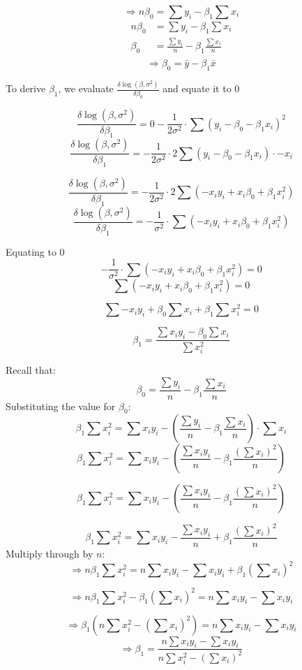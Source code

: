 \documentclass[
]{article}
\begin{document}
\[
\Rightarrow
n\beta_0  = \sum y_i - \beta_1\sum x_i
\] \begin{align*}
  n\beta_0  & = \sum y_i - \beta_1\sum x_i \\
  \beta_0   & = \frac{\sum y_i}{n} - \beta_1\frac{\sum x_i}{n} \\
\end{align*} \[
\boxed {\Rightarrow \beta_0 = \bar{y} - \beta_1\bar{x}}
\]

To derive \(\beta_1\), we evaluate
\(\frac{\delta\log(\beta,\sigma^2)}{\delta\beta_0}\) and equate it to
\(0\)

\[
\frac{\delta\log(\beta,\sigma^2)}{\delta\beta_1} 
=
0 - \frac{1}{2\sigma^2} \cdot \sum {(y_i - \beta_0 - \beta_1x_i)}^2
\] \[
\frac{\delta\log(\beta,\sigma^2)}{\delta\beta_1} 
=
-\frac{1}{2\sigma^2} \cdot 2\sum {(y_i - \beta_0 - \beta_1x_i)}\cdot -x_i
\]

\[
\frac{\delta\log(\beta,\sigma^2)}{\delta\beta_1} 
=
-\frac{1}{2\sigma^2} \cdot 2\sum {(-x_iy_i + x_i\beta_0 + \beta_1x_i^2)}
\] \[
\frac{\delta\log(\beta,\sigma^2)}{\delta\beta_1} 
=
-\frac{1}{\sigma^2} \cdot \sum (-x_iy_i + x_i\beta_0 + \beta_1x_i^2)
\]

Equating to \(0\) \[
-\frac{1}{\sigma^2} \cdot\sum {(-x_iy_i + x_i\beta_0 + \beta_1x_i^2)} = 0
\] \[
\sum {(-x_iy_i + x_i\beta_0 + \beta_1x_i^2)} = 0
\]

\[ 
  \sum -x_iy_i + \beta_0\sum x_i + \beta_1\sum x_i^2  = 0 
\]

\[
\beta_1  = \frac{\sum x_iy_i -  \beta_0\sum x_i}{\sum x_i^2}
\]

Recall that: \[
\beta_0    = \frac{\sum y_i}{n} - \beta_1\frac{\sum x_i}{n} 
\] Substituting the value for \(\beta_0\): \[
\beta_1\sum x_i^2  =
{\sum x_iy_i - 
\left( \frac{\sum y_i}{n} - 
\beta_1\frac{\sum x_i}{n} \right) \cdot \sum x_i}
\] \[
\beta_1\sum x_i^2  =
{\sum x_iy_i - 
\left( \frac{\sum x_iy_i}{n} - 
\beta_1\frac{({\sum x_i})^2}{n} \right)}
\]

\[
\beta_1\sum x_i^2  =
\sum x_iy_i - 
\left( \frac{\sum x_iy_i}{n} - 
\beta_1\frac{({\sum x_i})^2}{n} \right)
\]

\[
\beta_1\sum x_i^2  =
{\sum x_iy_i - 
 \frac{\sum x_iy_i}{n} +
\beta_1\frac{({\sum x_i})^2}{n} }
\] Multiply through by \(n\): \[
\Rightarrow 
n\beta_1\sum x_i^2  =
n\sum x_iy_i - 
\sum x_iy_i +
\beta_1 \left( \sum x_i \right)^2
\]

\[
\Rightarrow 
n\beta_1\sum x_i^2 -
\beta_1 \left( \sum x_i \right)^2 =
n\sum x_iy_i - 
\sum x_iy_i 
\]

\[
\Rightarrow 
\beta_1\left( n\sum x_i^2 -
\left( \sum x_i \right)^2 \right) =
n\sum x_iy_i - 
\sum x_iy_i 
\] \[
\boxed {
\Rightarrow 
\beta_1 =
\frac{n\sum x_iy_i - 
\sum x_iy_i}{ n\sum x_i^2 -
 \left(\sum x_i \right)^2}
}
\]
\end{document}
